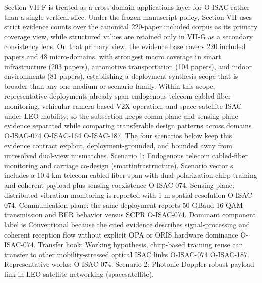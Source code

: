 {}Section VII-F is treated as a cross-domain applications layer for O-ISAC rather than a single vertical slice. Under the frozen manuscript policy, Section VII uses strict evidence counts over the canonical 220-paper included corpus as its primary coverage view, while structured  values are retained only in VII-G as a secondary consistency lens. On that primary view, the evidence base covers 220 included papers and 48 micro-domains, with strongest macro coverage in smart infrastructure (203 papers), automotive transportation (104 papers), and indoor environments (81 papers), establishing a deployment-synthesis scope that is broader than any one medium or scenario family. Within this scope, representative deployments already span endogenous telecom cabled-fiber monitoring, vehicular camera-based V2X operation, and space-satellite ISAC under LEO mobility, so the subsection keeps comm-plane and sensing-plane evidence separated while comparing transferable design patterns across domains O-ISAC-074 O-ISAC-164 O-ISAC-187. The four scenarios below keep this evidence contract explicit, deployment-grounded, and bounded away from unresolved dual-view mismatches.\markdownRendererInterblockSeparator
{}
\markdownRendererSectionEnd \markdownRendererSectionBegin
{}\markdownRendererInterblockSeparator
{}Scenario 1: Endogenous telecom cabled-fiber monitoring and carriage co-design (smart\markdownRendererUnderscore{}infrastructure).\markdownRendererHardLineBreak
{}Scenario vector s includes a 10.4 km telecom cabled-fiber span with dual-polarization chirp training and coherent payload plus sensing coexistence O-ISAC-074. Sensing plane: distributed vibration monitoring is reported with 1 m spatial resolution O-ISAC-074. Communication plane: the same deployment reports 50 GBaud 16-QAM transmission and BER behavior versus SCPR O-ISAC-074. Dominant component label is Conventional because the cited evidence describes signal-processing and coherent reception flow without explicit OPA or ORIS hardware dominance O-ISAC-074. Transfer hook: Working hypothesis, chirp-based training reuse can transfer to other mobility-stressed optical ISAC links O-ISAC-074 O-ISAC-187. Representative works: O-ISAC-074.\markdownRendererParagraphSeparator
{}Scenario 2: Photonic Doppler-robust payload link in LEO satellite networking (space\markdownRendererUnderscore{}satellite).\markdownRendererHardLineBreak
